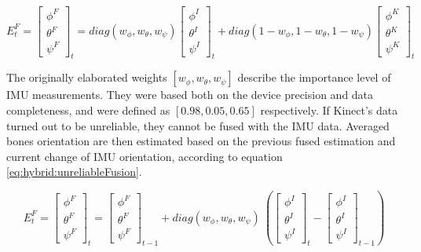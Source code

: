 \documentclass[sensors,article,submit,moreauthors,pdftex,10pt,a4paper]{mdpi}
\begin{document}
\begin{equation} E^F_t = 
	\begin{bmatrix}  \phi^F \\  \theta^F \\  \psi^F \end{bmatrix}_t = 
	diag(w_\phi,w_\theta,w_\psi)
	\begin{bmatrix}  \phi^I \\  \theta^I \\  \psi^I \end{bmatrix}_t + 
	diag(1-w_\phi,1-w_\theta,1-w_\psi)
	\begin{bmatrix}  \phi^K \\  \theta^K \\  \psi^K \end{bmatrix}_t
	\label{eq:hybrid:reliableFusion}
\end{equation}

The originally elaborated weights $[w_\phi , w_\theta , w_\psi]$ describe the importance level of IMU measurements. They were based both on the device precision and data completeness, and were defined as $[0.98, 0.05, 0.65]$ respectively. 
If Kinect’s data turned out to be unreliable, they cannot be fused with the IMU data. Averaged bones orientation are then estimated based on the previous fused estimation and current change of IMU orientation, according to equation \ref{eq:hybrid:unreliableFusion}.


\begin{equation} 
	\label{eq:hybrid:unreliableFusion}
	E^F_t = 
	\begin{bmatrix}  \phi^F \\  \theta^F \\  \psi^F \end{bmatrix}_t = 
	\begin{bmatrix}  \phi^F \\  \theta^F \\  \psi^F \end{bmatrix}_{t-1} +
	diag(w_\phi,w_\theta,w_\psi)\
	(\begin{bmatrix}  \phi^I \\  \theta^I \\  \psi^I \end{bmatrix}_t -
	\begin{bmatrix}  \phi^I \\  \theta^I \\  \psi^I \end{bmatrix}_{t-1})
\end{equation}
\end{document}
